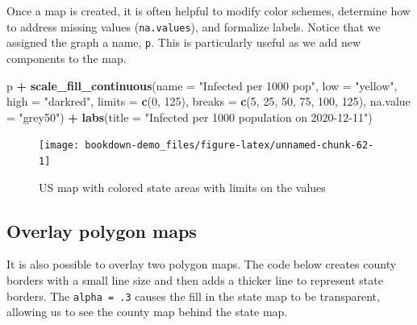 \documentclass[]{book}
\newenvironment{Shaded}{\begin{snugshade}}{\end{snugshade}}
\newcommand{\KeywordTok}[1]{\textcolor[rgb]{0.13,0.29,0.53}{\textbf{#1}}}
\newcommand{\DataTypeTok}[1]{\textcolor[rgb]{0.13,0.29,0.53}{#1}}
\newcommand{\DecValTok}[1]{\textcolor[rgb]{0.00,0.00,0.81}{#1}}
\newcommand{\StringTok}[1]{\textcolor[rgb]{0.31,0.60,0.02}{#1}}
\newcommand{\OperatorTok}[1]{\textcolor[rgb]{0.81,0.36,0.00}{\textbf{#1}}}
\newcommand{\NormalTok}[1]{#1}
\begin{document}
Once a map is created, it is often helpful to modify color schemes,
determine how to address missing values (\texttt{na.values}), and
formalize labels. Notice that we assigned the graph a name, \texttt{p}.
This is particularly useful as we add new components to the map.

\begin{Shaded}
\begin{Highlighting}[]
\NormalTok{p }\OperatorTok{+}\StringTok{ }\KeywordTok{scale_fill_continuous}\NormalTok{(}\DataTypeTok{name =} \StringTok{"Infected per 1000 pop"}\NormalTok{,}
                          \DataTypeTok{low =} \StringTok{"yellow"}\NormalTok{, }\DataTypeTok{high =} \StringTok{"darkred"}\NormalTok{,}
                          \DataTypeTok{limits =} \KeywordTok{c}\NormalTok{(}\DecValTok{0}\NormalTok{, }\DecValTok{125}\NormalTok{), }
                          \DataTypeTok{breaks =} \KeywordTok{c}\NormalTok{(}\DecValTok{5}\NormalTok{, }\DecValTok{25}\NormalTok{, }\DecValTok{50}\NormalTok{, }\DecValTok{75}\NormalTok{, }\DecValTok{100}\NormalTok{, }\DecValTok{125}\NormalTok{), }
                          \DataTypeTok{na.value =} \StringTok{"grey50"}\NormalTok{) }\OperatorTok{+}
\StringTok{  }\KeywordTok{labs}\NormalTok{(}\DataTypeTok{title =} \StringTok{"Infected per 1000 population on 2020-12-11"}\NormalTok{)}
\end{Highlighting}
\end{Shaded}

\begin{figure}

{\centering \texttt{[image: bookdown-demo\_files/figure-latex/unnamed-chunk-62-1]} 

}

\caption{US map with colored state areas with limits on the values}\label{fig:unnamed-chunk-62}
\end{figure}

\subsection{Overlay polygon maps}\label{overlay-polygon-maps}

It is also possible to overlay two polygon maps. The code below creates
county borders with a small line size and then adds a thicker line to
represent state borders. The \texttt{alpha\ =\ .3} causes the fill in
the state map to be transparent, allowing us to see the county map
behind the state map.
\end{document}
